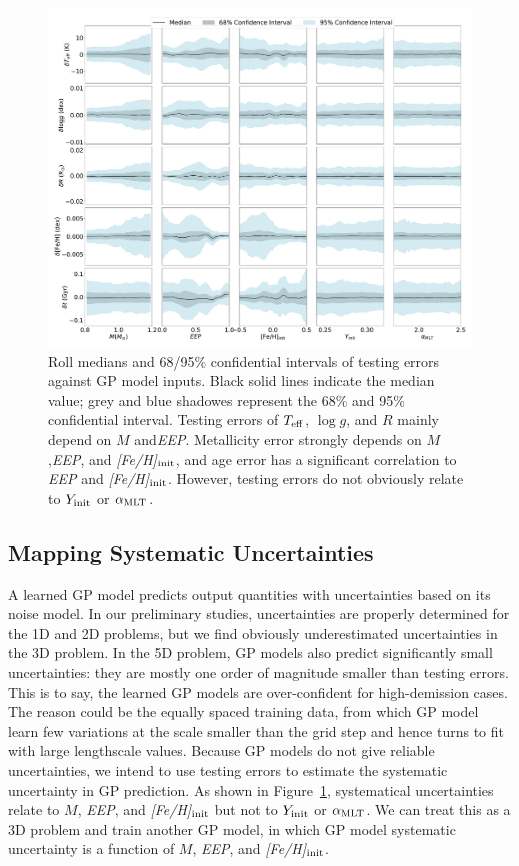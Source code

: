 \begin{figure}
	\includegraphics[width=2.0\columnwidth]{ 5d-testing_vs_inputs.pdf}
    \caption{ Roll medians and 68/95\% confidential intervals of testing errors against GP model  inputs. Black solid lines indicate the median value; grey and blue shadowes represent the 68\% and 95\% confidential interval. Testing errors of $T_{\rm eff}$, $\log g$, and $R$ mainly depend on $M$ and{\it EEP}. Metallicity error strongly depends on $M$,{\it EEP}, and {\it [Fe/H]}$_{\rm init}$, and age error has a significant correlation to {\it EEP} and {\it [Fe/H]}$_{\rm init}$. However, testing errors do not obviously relate to $Y_{\rm init}$ or $\alpha_{\rm MLT}$. } 
  \label{fig:5d_test_vs_input}
\end{figure}
%

\subsection{Mapping Systematic Uncertainties}\label{sec:sys}

A learned GP model predicts output quantities with uncertainties based on its noise model. In our preliminary studies, uncertainties are properly determined for the 1D and 2D problems, but we find obviously underestimated uncertainties in the 3D problem. In the 5D problem, GP models also predict significantly small uncertainties: they are mostly one order of magnitude smaller than testing errors. This is to say, the learned GP models are over-confident for high-demission cases. The reason could be the equally spaced training data, from which GP model learn few variations at the scale smaller than the grid step and hence turns to fit with large lengthscale values.   
% 
Because GP models do not give reliable uncertainties, we intend to use testing errors to estimate the systematic uncertainty in GP prediction. As shown in Figure~\ref{fig:5d_test_vs_input}, systematical uncertainties relate to $M$, {\it EEP}, and {\it [Fe/H]}$_{\rm init}$ but not to $Y_{\rm init}$ or $\alpha_{\rm MLT}$.  We can treat this as a 3D problem and train another GP model, in which GP model systematic uncertainty is a function of $M$, {\it EEP}, and {\it [Fe/H]}$_{\rm init}$. 
%

